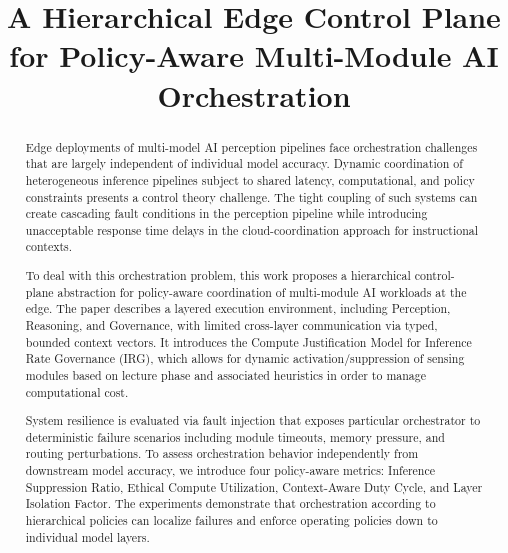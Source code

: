 \documentclass[conference]{IEEEtran}
\begin{document}
\title{A Hierarchical Edge Control Plane for Policy-Aware Multi-Module AI Orchestration}

\author{
}

\maketitle

\begin{abstract}
Edge deployments of multi-model AI perception pipelines face orchestration challenges that are largely independent of individual model accuracy. Dynamic coordination of heterogeneous inference pipelines subject to shared latency, computational, and policy constraints presents a control theory challenge. The tight coupling of such systems can create cascading fault conditions in the perception pipeline while introducing unacceptable response time delays in the cloud-coordination approach for instructional contexts.

To deal with this orchestration problem, this work proposes a hierarchical control-plane abstraction for policy-aware coordination of multi-module AI workloads at the edge. The paper describes a layered execution environment, including Perception, Reasoning, and Governance, with limited cross-layer communication via typed, bounded context vectors. It introduces the Compute Justification Model for Inference Rate Governance (IRG), which allows for dynamic activation/suppression of sensing modules based on lecture phase and associated heuristics in order to manage computational cost.

System resilience is evaluated via fault injection that exposes particular orchestrator to deterministic failure scenarios including module timeouts, memory pressure, and routing perturbations. To assess orchestration behavior independently from downstream model accuracy, we introduce four policy-aware metrics: Inference Suppression Ratio, Ethical Compute Utilization, Context-Aware Duty Cycle, and Layer Isolation Factor. The experiments demonstrate that orchestration according to hierarchical policies can localize failures and enforce operating policies down to individual model layers.
\end{abstract}
\end{document}
